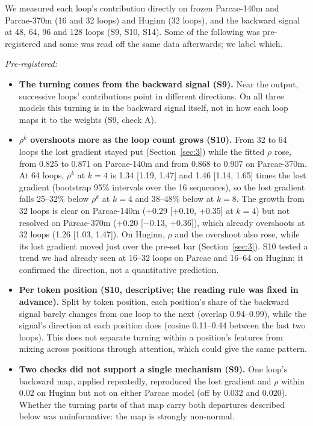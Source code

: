 \documentclass[10pt]{article}
\begin{document}
We measured each loop's contribution directly on frozen Parcae-140m and Parcae-370m (16 and 32 loops) and Huginn (32 loops), and the backward signal at 48, 64, 96 and 128 loops (S9, S10, S14). Some of the following was pre-registered and some was read off the same data afterwards; we label which.

\emph{Pre-registered:}

\begin{itemize}
\item \textbf{The turning comes from the backward signal (S9).} Near the output, successive loops' contributions point in different directions. On all three models this turning is in the backward signal itself, not in how each loop maps it to the weights (S9, check A).
\item \textbf{$\rho^{k}$ overshoots more as the loop count grows (S10).} From 32 to 64 loops the lost gradient stayed put (Section~\ref{sec:3}) while the fitted $\rho$ rose, from 0.825 to 0.871 on Parcae-140m and from 0.868 to 0.907 on Parcae-370m. At 64 loops, $\rho^{k}$ at $k = 4$ is 1.34 [1.19, 1.47] and 1.46 [1.14, 1.65] times the lost gradient (bootstrap 95\% intervals over the 16 sequences), so the lost gradient falls 25--32\% below $\rho^{k}$ at $k = 4$ and 38--48\% below at $k = 8$. The growth from 32 loops is clear on Parcae-140m (+0.29 [+0.10, +0.35] at $k = 4$) but not resolved on Parcae-370m (+0.20 [$-$0.13, +0.36]), which already overshoots at 32 loops (1.26 [1.03, 1.47]). On Huginn, $\rho$ and the overshoot also rose, while its lost gradient moved just over the pre-set bar (Section~\ref{sec:3}). S10 tested a trend we had already seen at 16--32 loops on Parcae and 16--64 on Huginn; it confirmed the direction, not a quantitative prediction.
\item \textbf{Per token position (S10, descriptive; the reading rule was fixed in advance).} Split by token position, each position's share of the backward signal barely changes from one loop to the next (overlap 0.94--0.99), while the signal's direction at each position does (cosine 0.11--0.44 between the last two loops). This does not separate turning within a position's features from mixing across positions through attention, which could give the same pattern.
\item \textbf{Two checks did not support a single mechanism (S9).} One loop's backward map, applied repeatedly, reproduced the lost gradient and $\rho$ within 0.02 on Huginn but not on either Parcae model (off by 0.032 and 0.020). Whether the turning parts of that map carry both departures described below was uninformative: the map is strongly non-normal.
\end{itemize}
\end{document}
